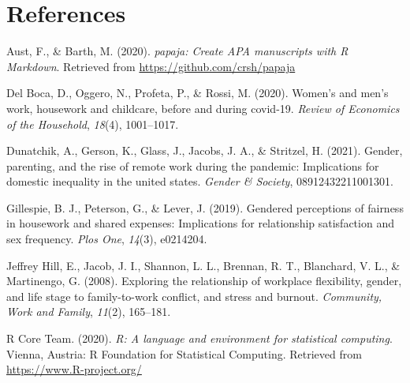 \documentclass[
  english,
  man]{apa6}
\newlength{\cslhangindent}
\newenvironment{cslreferences}%
  {\setlength{\parindent}{0pt}%
  \everypar{\setlength{\hangindent}{\cslhangindent}}\ignorespaces}%
  {\par}
\begin{document}
\newpage

\hypertarget{references}{%
\section{References}\label{references}}

\begingroup
\setlength{\parindent}{-0.5in}
\setlength{\leftskip}{0.5in}

\hypertarget{refs}{}
\begin{cslreferences}
\leavevmode\hypertarget{ref-R-papaja}{}%
Aust, F., \& Barth, M. (2020). \emph{papaja: Create APA manuscripts with R Markdown}. Retrieved from \url{https://github.com/crsh/papaja}

\leavevmode\hypertarget{ref-del2020women}{}%
Del Boca, D., Oggero, N., Profeta, P., \& Rossi, M. (2020). Women's and men's work, housework and childcare, before and during covid-19. \emph{Review of Economics of the Household}, \emph{18}(4), 1001--1017.

\leavevmode\hypertarget{ref-dunatchik2021gender}{}%
Dunatchik, A., Gerson, K., Glass, J., Jacobs, J. A., \& Stritzel, H. (2021). Gender, parenting, and the rise of remote work during the pandemic: Implications for domestic inequality in the united states. \emph{Gender \& Society}, 08912432211001301.

\leavevmode\hypertarget{ref-gillespie2019gendered}{}%
Gillespie, B. J., Peterson, G., \& Lever, J. (2019). Gendered perceptions of fairness in housework and shared expenses: Implications for relationship satisfaction and sex frequency. \emph{Plos One}, \emph{14}(3), e0214204.

\leavevmode\hypertarget{ref-jeffrey2008exploring}{}%
Jeffrey Hill, E., Jacob, J. I., Shannon, L. L., Brennan, R. T., Blanchard, V. L., \& Martinengo, G. (2008). Exploring the relationship of workplace flexibility, gender, and life stage to family-to-work conflict, and stress and burnout. \emph{Community, Work and Family}, \emph{11}(2), 165--181.

\leavevmode\hypertarget{ref-R-base}{}%
R Core Team. (2020). \emph{R: A language and environment for statistical computing}. Vienna, Austria: R Foundation for Statistical Computing. Retrieved from \url{https://www.R-project.org/}
\end{cslreferences}

\endgroup
\end{document}
